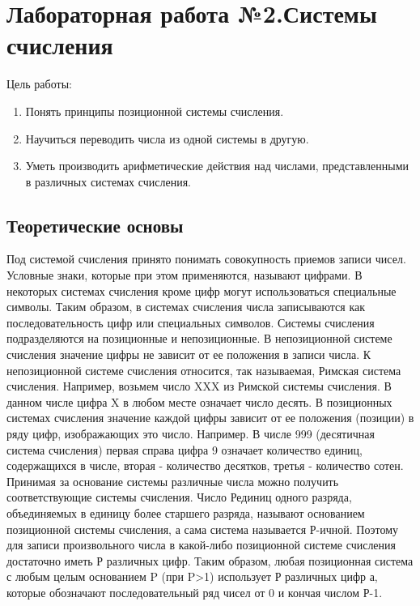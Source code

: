 

%


\section{Лабораторная работа №2.\newline Системы счисления}

Цель работы:
\begin{enumerate}
    \item Понять принципы позиционной системы счисления.
    \item Научиться переводить числа из одной системы в другую.
    \item Уметь производить арифметические действия над числами, представленными в различных системах счисления.
\end{enumerate}

\subsection{Теоретические основы}

Под системой счисления принято понимать совокупность приемов записи чисел. Условные знаки, которые при этом применяются, называют цифрами. В некоторых системах счисления кроме цифр могут использоваться специальные символы. Таким образом, в системах счисления числа записываются как последовательность цифр или специальных символов. Системы счисления подразделяются на позиционные и непозиционные. В непозиционной системе счисления значение цифры не зависит от ее положения в записи числа. К непозиционной системе счисления относится, так называемая, Римская система счисления. Например, возьмем число XXX из Римской системы счисления. В данном числе цифра X в любом месте означает число десять. В позиционных системах счисления значение каждой цифры зависит от ее положения (позиции) в ряду цифр, изображающих это число. Например. В числе 999 (десятичная система счисления) первая справа цифра 9 означает количество единиц, содержащихся в числе, вторая - количество десятков, третья - количество сотен. Принимая за основание системы различные числа можно получить соответствующие системы счисления. Число Рединиц одного разряда, объединяемых в единицу более старшего разряда, называют основанием позиционной системы счисления, а сама система называется Р-ичной. Поэтому для записи произвольного числа в какой-либо позиционной системе счисления достаточно иметь Р различных цифр. Таким образом, любая позиционная система с любым целым основанием P (при P>1) использует Р различных цифр а, которые обозначают последовательный ряд чисел от 0 и кончая числом Р-1.

